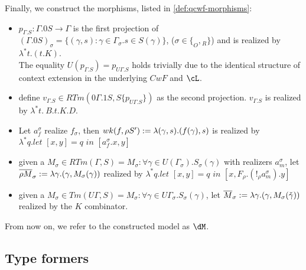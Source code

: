 \documentclass[12pt,a4paper]{article}
\renewcommand{\O}{_{O}}\alwaysmath{O}
\newcommand{\R}{\ensuremath{_{R}}}
\begin{document}
Finally, we construct the morphisms, listed in \cref{def:qcwf-morphisms}:
\begin{itemize}
  \item $p_{\Gamma.S}: \Gamma. 0 S \to \Gamma$ is the first projection of $(\Gamma. 0 S)_\sigma = \{ (\gamma, s) : \gamma \in \Gamma_\sigma. s \in S(\gamma)\}$, ($\sigma \in \{\O, \R \}$) and is realized by $\lambda^* t. (t.K)$.\\
  The equality $U(p_{\Gamma.S}) = p_{U\Gamma.S}$ holds trivially due to the identical structure of context extension in the underlying $CwF$ and $\cL$.
  
  \item define $v_{\Gamma.S} \in RTm(0\Gamma.1S, S\{p_{U\Gamma.S}\})$ as the second projection. $v_{\Gamma.S}$ is realized by $\lambda^* t.\ B.t.K.D$.
  
  \item Let $a^\sigma_f$ realize $f_\sigma$, then $wk(f, \rho S') := \lambda (\gamma, s). (f (\gamma), s)$ is realized by $\lambda^* q. \textit{let }[x, y] = q \textit{ in } [a^\sigma_f . x , y]$
  
  \item given a $M_\sigma \in RTm(\Gamma, S) = M_\sigma : \forall \gamma \in U(\Gamma_\sigma). S_\sigma(\gamma)$ with realizers $a^\sigma_m$, let $\overline{\rho M}_\sigma := \lambda \gamma. (\gamma, M_\sigma(\gamma))$ realized by $\lambda^* q. \textit{let }[x, y] = q \textit{ in } [x, F_\rho.(!_\rho a^\sigma_m).y]$   
  
  \item given a $M_\sigma \in Tm(U\Gamma, S) = M_\sigma : \forall \gamma \in U\Gamma_\sigma. S_\sigma(\gamma)$, let $\overline{M}_\sigma := \lambda \gamma. (\gamma, M_\sigma(\check\gamma))$ realized by the $K$ combinator.
\end{itemize}

From now on, we refer to the constructed model as $\dM$.

\subsection*{Type formers}

\end{document}
